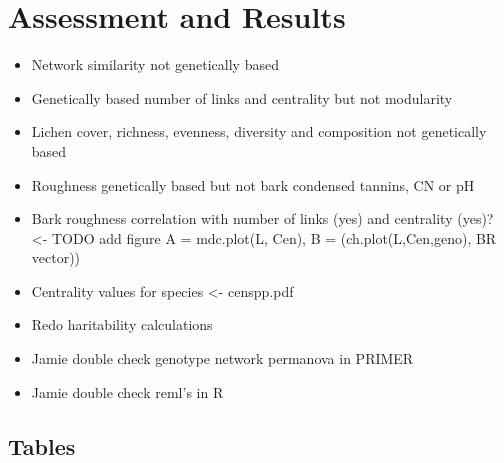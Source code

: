 \documentclass[11pt,twocolumn,twoside,lineno]{pnas-new}
\begin{document}


\showacknow{} %



\newpage

\section*{Assessment and Results}

\begin{itemize}
\item Network similarity not genetically based
\item Genetically based number of links and centrality but not modularity
\item Lichen cover, richness, evenness, diversity and composition not
  genetically based
\item Roughness genetically based but not bark condensed tannins, CN
  or pH
\item Bark roughness correlation with number of links (yes) and
  centrality (yes)? <- TODO add figure A = mdc.plot(L, Cen), B = (ch.plot(L,Cen,geno), BR vector))
\item Centrality values for species <- censpp.pdf
\item Redo haritability calculations
\item Jamie double check genotype network permanova in PRIMER
\item Jamie double check reml's in R
\end{itemize}

\setcounter{figure}{0}
\setcounter{table}{0}

\subsection*{Tables}
\end{document}
